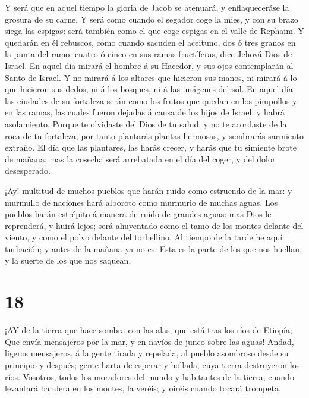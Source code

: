  Y será que en aquel tiempo la gloria de Jacob se atenuará,
y enflaqueceráse la grosura de su carne.  Y será como cuando
el segador coge la mies, y con su brazo siega las espigas: será también
como el que coge espigas en el valle de Rephaim.  Y quedarán
en él rebuscos, como cuando sacuden el aceituno, dos ó tres granos en la
punta del ramo, cuatro ó cinco en sus ramas fructíferas, dice Jehová
Dios de Israel.  En aquel día mirará el hombre á su Hacedor,
y sus ojos contemplarán al Santo de Israel.  Y no mirará á
los altares que hicieron sus manos, ni mirará á lo que hicieron sus
dedos, ni á los bosques, ni á las imágenes del sol.  En
aquel día las ciudades de su fortaleza serán como los frutos que quedan
en los pimpollos y en las ramas, las cuales fueron dejadas á causa de
los hijos de Israel; y habrá asolamiento.  Porque te
olvidaste del Dios de tu salud, y no te acordaste de la roca de tu
fortaleza; por tanto plantarás plantas hermosas, y sembrarás sarmiento
extraño.  El día que las plantares, las harás crecer, y
harás que tu simiente brote de mañana; mas la cosecha será arrebatada en
el día del coger, y del dolor desesperado.

 ¡Ay! multitud de muchos pueblos que harán ruido como
estruendo de la mar: y murmullo de naciones hará alboroto como murmurio
de muchas aguas.  Los pueblos harán estrépito á manera de
ruido de grandes aguas: mas Dios le reprenderá, y huirá lejos; será
ahuyentado como el tamo de los montes delante del viento, y como el
polvo delante del torbellino.  Al tiempo de la tarde he
aquí turbación; y antes de la mañana ya no es. Esta es la parte de los
que nos huellan, y la suerte de los que nos saquean.

\hypertarget{section-17}{%
\section{18}\label{section-17}}

 ¡AY de la tierra que hace sombra con las alas, que está
tras los ríos de Etiopía;  Que envía mensajeros por la mar,
y en navíos de junco sobre las aguas! Andad, ligeros mensajeros, á la
gente tirada y repelada, al pueblo asombroso desde su principio y
después; gente harta de esperar y hollada, cuya tierra destruyeron los
ríos.  Vosotros, todos los moradores del mundo y habitantes
de la tierra, cuando levantará bandera en los montes, la veréis; y
oiréis cuando tocará trompeta.

